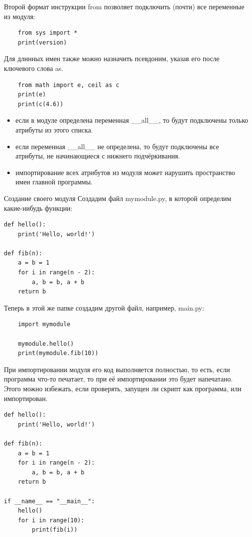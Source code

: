 \documentclass[xcolor=table]{beamer}
\begin{document}
\begin{frame}[fragile]
	Второй формат инструкции from позволяет подключить (почти) все переменные из модуля: 	
	\begin{verbatim}
	from sys import *
	print(version)
	\end{verbatim}
	
	Для длинных имен также можно назначить псевдоним, указав его после ключевого слова as.
	\begin{verbatim}
	from math import e, ceil as c
	print(e)
	print(c(4.6))
	\end{verbatim}
	
	\begin{itemize}
		\item если в модуле определена переменная \_\_all\_\_, то будут подключены только атрибуты из этого списка. 
		\item если переменная \_\_all\_\_ не определена, то будут подключены все атрибуты, не начинающиеся с нижнего подчёркивания. 
		\item импортирование всех атрибутов из модуля может нарушить пространство имен главной программы.
	\end{itemize}
\end{frame}

\begin{frame}[fragile]{Создание своего модуля}
	Создадим файл mymodule.py, в которой определим какие-нибудь функции: 	
	\begin{verbatim}
def hello():
	print('Hello, world!')

def fib(n):
	a = b = 1
	for i in range(n - 2):
		a, b = b, a + b
	return b
	\end{verbatim}
	
	Теперь в этой же папке создадим другой файл, например, main.py:
	\begin{verbatim}
	import mymodule
	
	mymodule.hello()
	print(mymodule.fib(10))
	\end{verbatim}
\end{frame}

\begin{frame}[fragile]
	При импортировании модуля его код выполняется полностью, то есть, если программа что-то печатает, то при её импортировании это будет напечатано. Этого можно избежать, если проверять, запущен ли скрипт как программа, или импортирован.
	\begin{verbatim}
def hello():
	print('Hello, world!')

def fib(n):
	a = b = 1
	for i in range(n - 2):
		a, b = b, a + b
	return b
	
if __name__ == "__main__":
	hello()
	for i in range(10):
		print(fib(i))
	\end{verbatim}
\end{frame}
\end{document}
